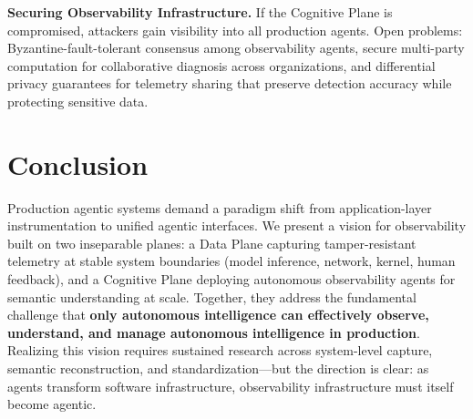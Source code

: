 \documentclass[sigplan,screen,9pt]{acmart}
\begin{document}
\textbf{Securing Observability Infrastructure.} If the Cognitive Plane is compromised, attackers gain visibility into all production agents. Open problems: Byzantine-fault-tolerant consensus among observability agents, secure multi-party computation for collaborative diagnosis across organizations, and differential privacy guarantees for telemetry sharing that preserve detection accuracy while protecting sensitive data.

\section{Conclusion}

Production agentic systems demand a paradigm shift from application-layer instrumentation to unified agentic interfaces. We present a vision for observability built on two inseparable planes: a Data Plane capturing tamper-resistant telemetry at stable system boundaries (model inference, network, kernel, human feedback), and a Cognitive Plane deploying autonomous observability agents for semantic understanding at scale. Together, they address the fundamental challenge that \textbf{only autonomous intelligence can effectively observe, understand, and manage autonomous intelligence in production}. Realizing this vision requires sustained research across system-level capture, semantic reconstruction, and standardization—but the direction is clear: as agents transform software infrastructure, observability infrastructure must itself become agentic.



\end{document}
